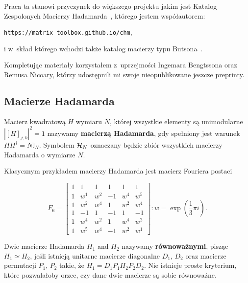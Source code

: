 \documentclass[a4paper,12pt,twoside]{article}
\newcommand{\HADAMARDS}[1]{{\cal H}_{#1}}
\begin{document}
Praca ta stanowi przyczynek do wi\k{e}kszego projektu jakim jest Katalog Zespolonych Macierzy Hadamarda~\cite{TZ06}, kt\'{o}rego jestem wsp\'{o}{\l}autorem:
\begin{center}
\verb"https://matrix-toolbox.github.io/chm",
\end{center}
i w~sk{\l}ad kt\'{o}rego wchodzi tak\.{z}e katalog macierzy typu Butsona~\cite{Bu62, Bu63}.

Kompletuj\k{a}c materia{\l}y korzysta{\l}em z~uprzejmo\'{s}ci Ingemara Bengtssona oraz Remusa Nicoary, kt\'{o}rzy udost\k{e}pnili mi swoje nieopublikowane jeszcze preprinty.


\subsection*{Macierze Hadamarda}

Macierz kwadratow\k{a} $H$ wymiaru $N$, kt\'{o}rej wszystkie elementy s\k{a} unimodularne $|[H]_{j,k}|^2=1$ nazywamy \textbf{macierz\k{a} Hadamarda}, gdy spe{\l}niony jest warunek $H H^{\dagger}=N\mathbb{I}_N$. Symbolem $\HADAMARDS{N}$ oznaczany b\k{e}dzie zbi\'{o}r wszystkich macierzy Hadamarda o wymiarze $N$.

Klasycznym przyk{\l}adem macierzy Hadamarda jest macierz Fouriera postaci

\begin{equation}
F_6 =\left[
\begin{array}{rrrrrr}
1 &   1 &   1 &   1 &   1 &   1\\
1 & w^1 & w^2 &  -1 & w^4 & w^5\\
1 & w^2 & w^4 &   1 & w^2 & w^4\\
1 &  -1 &   1 &  -1 &   1 &  -1\\
1 & w^4 & w^2 &   1 & w^4 & w^2\\
1 & w^5 & w^4 &  -1 & w^2 & w^1
\end{array}
\right]:w = \exp\left(\frac{1}{3} \pi i\right).
\end{equation}

Dwie macierze Hadamarda $H_1$ and $H_2$ nazywamy \textbf{r\'{o}wnowa\.{z}nymi}, pisz\k{a}c $H_1 \simeq H_2$, je\'{s}li istniej\k{a} unitarne macierze diagonalne $D_1$, $D_2$ oraz macierze permutacji $P_1$, $P_2$ takie, \.{z}e $H_1 = D_1 P_1 H_2 P_2 D_2$. Nie istnieje proste kryterium, kt\'{o}re pozwala{\l}oby orzec, czy dane dwie macierze s\k{a} sobie r\'{o}wnowa\.{z}ne.
\end{document}
